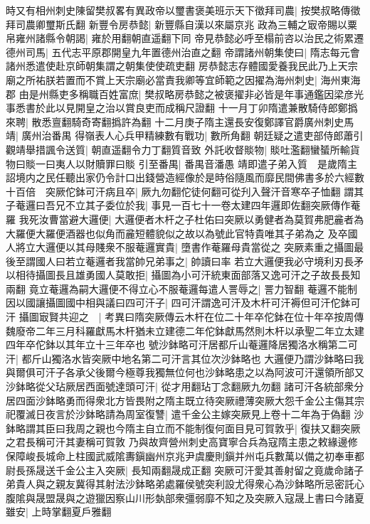 時又有相州刺史陳留樊叔畧有異政帝以璽書褒美班示天下徵拜司農|{
	按樊叔略傳徵拜司農卿璽斯氏翻}
新豐令房恭懿|{
	新豐縣自漢以來屬京兆}
政為三輔之㝡帝賜以粟帛雍州諸縣令朝謁|{
	雍於用翻朝直遥翻下同}
帝見恭懿必呼至榻前咨以治民之術累遷德州司馬|{
	五代志平原郡開皇九年置德州治直之翻}
帝謂諸州朝集使曰|{
	隋志每元會諸州悉遣使赴京師朝集謂之朝集使使疏吏翻}
房恭懿志存體國愛養我民此乃上天宗廟之所祐朕若置而不賞上天宗廟必當責我卿等宜師範之因擢為海州刺史|{
	海州東海郡}
由是州縣吏多稱職百姓富庶|{
	樊叔略房恭懿之被褒擢非必皆是年事通鑑因梁彦光事悉書於此以見開皇之治以賞良吏而成稱尺證翻}
十一月丁卯隋遣兼散騎侍郎鄭撝來聘|{
	散悉亶翻騎奇寄翻撝許為翻}
十二月庚子隋主還長安復鄭譯官爵廣州刺史馬靖|{
	廣州治番禺}
得嶺表人心兵甲精練數有戰功|{
	數所角翻}
朝廷疑之遣吏部侍郎蕭引觀靖舉措諷令送質|{
	朝直遥翻令力丁翻質音致}
外託收督賧物|{
	賧吐濫翻蠻蜑所輸貨物曰賧一曰夷人以財贖罪曰賧}
引至番禺|{
	番禺音潘愚}
靖即遣子弟入質　是歲隋主詔境内之民任聽出家仍令計口出錢營造經像於是時俗隨風而靡民間佛書多於六經數十百倍　突厥佗鉢可汗病且卒|{
	厥九勿翻佗徒何翻可從刋入聲汗音寒卒子恤翻}
謂其子菴邏曰吾兄不立其子委位於我|{
	事見一百七十一卷太建四年邏即佐翻突厥傳作菴羅}
我死汝曹當避大邏便|{
	大邏便者木杆之子杜佑曰突厥以勇健者為莫賀弗肥麄者為大羅便大羅便酒器也似角而麄短體貌似之故以為號此官特貴唯其子弟為之}
及卒國人將立大邏便以其母賤衆不服菴邏實貴|{
	墮書作菴羅母貴當從之}
突厥素重之攝圖最後至謂國人曰若立菴邏者我當帥兄弟事之|{
	帥讀曰率}
若立大邏便我必守境利刃長矛以相待攝圖長且雄勇國人莫敢拒|{
	攝圖為小可汗統東面部落又逸可汗之子故長長知兩翻}
竟立菴邏為嗣大邏便不得立心不服菴邏每遣人詈辱之|{
	詈力智翻}
菴邏不能制因以國讓攝圖國中相與議曰四可汗子|{
	四可汗謂逸可汗及木杆可汗褥但可汗佗鉢可汗}
攝圖㝡賢共迎之　|{
	考異曰隋突厥傳云木杆在位二十年卒佗鉢在位十年卒按周傳魏廢帝二年三月科羅獻馬木杆猶未立建德二年佗鉢獻馬然則木杆以承聖二年立太建四年卒佗鉢以其年立十三年卒也}
號沙鉢略可汗居都斤山菴邏降居獨洛水稱第二可汗|{
	都斤山獨洛水皆突厥中地名第二可汗言其位次沙鉢略也}
大邏便乃謂沙鉢略曰我與爾俱可汗子各承父後爾今極尊我獨無位何也沙鉢略患之以為阿波可汗還領所部又沙鉢略從父玷厥居西面號達頭可汗|{
	從才用翻玷丁念翻厥九勿翻}
諸可汗各統部衆分居四面沙鉢略勇而得衆北方皆畏附之隋主既立待突厥禮薄突厥大怨千金公主傷其宗祀覆滅日夜言於沙鉢略請為周室復讐|{
	遣千金公主嫁突厥見上卷十二年為于偽翻}
沙鉢略謂其臣曰我周之親也今隋主自立而不能制復何面目見可賀敦乎|{
	復扶又翻突厥之君長稱可汗其妻稱可賀敦}
乃與故齊營州刺史高寶寧合兵為寇隋主患之敕緣邊修保障峻長城命上柱國武威隂夀鎭幽州京兆尹虞慶則鎭并州屯兵數萬以備之初奉車都尉長孫晟送千金公主入突厥|{
	長知兩翻晟成正翻}
突厥可汗愛其善射留之竟歲命諸子弟貴人與之親友冀得其射法沙鉢略弟處羅侯號突利設尤得衆心為沙鉢略所忌密託心腹隂與晟盟晟與之遊獵因察山川形埶部衆彊弱靡不知之及突厥入寇晟上書曰今諸夏雖安|{
	上時掌翻夏戶雅翻}
